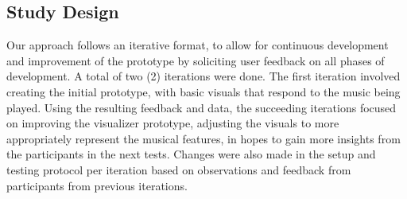 \subsection{Study Design}

Our approach follows an iterative format, to allow for continuous development and improvement of the prototype by soliciting user feedback on all phases of development. A total of two (2) iterations were done. The first iteration involved creating the initial prototype, with basic visuals that respond to the music being played. Using the resulting feedback and data, the succeeding iterations focused on improving the visualizer prototype, adjusting the visuals to more appropriately represent the musical features, in hopes to gain more insights from the participants in the next tests. Changes were also made in the setup and testing protocol per iteration based on observations and feedback from participants from previous iterations.

